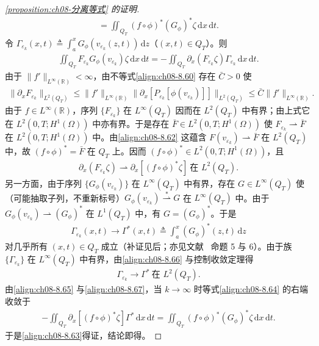 \documentclass[../../main.tex]{subfiles}%
\begin{document}
\begin{proof}[\cref{proposition:ch08-分离等式} 的证明]
\begin{align}
=\iint_{Q_T}(f\circ\phi)^*(G_\phi)^*\zeta\,\mathrm{d}x\,\mathrm{d}t. \label{align:ch08-8.63}
\end{align}
令 $\Gamma_{\varepsilon_k}(x,t)\triangleq\int_a^xG_\phi(v_{\varepsilon_k}(z,t))\,\mathrm{d}z$（$(x,t)\in Q_T$）。则
\begin{align}
\iint_{Q_T}F_{\varepsilon_k}G_\phi(v_{\varepsilon_k})\zeta\,\mathrm{d}x\,\mathrm{d}t
=-\iint_{Q_T}\partial_x(F_{\varepsilon_k}\zeta)\Gamma_{\varepsilon_k}\,\mathrm{d}x\,\mathrm{d}t. \label{align:ch08-8.64}
\end{align}
由于 $\|f'\|_{L^\infty(\mathbb{R})}<\infty$，由不等式\eqref{align:ch08-8.60} 存在 $\bar C>0$ 使
\begin{align*}
\|\partial_xF_{\varepsilon_k}\|_{L^2(Q_T)}
\leqslant\|f'\|_{L^\infty(\mathbb{R})}\|\partial_x[P_{\varepsilon_k}[\phi(v_{\varepsilon_k})]]\|_{L^2(Q_T)}
\leqslant\bar C\|f'\|_{L^\infty(\mathbb{R})}.
\end{align*}
由于 $f\in L^\infty(\mathbb{R})$，序列 $\{F_{\varepsilon_k}\}$ 在 $L^\infty(Q_T)$ 因而在 $L^2(Q_T)$ 中有界；由上式它在 $L^2(0,T;H^1(\Omega))$ 中亦有界。于是存在 $\bar F\in L^2(0,T;H^1(\Omega))$ 使 $F_{\varepsilon_k}\rightharpoonup\bar F$ 在 $L^2(0,T;H^1(\Omega))$ 中。由\eqref{align:ch08-8.62} 这蕴含 $F(v_{\varepsilon_k})\rightharpoonup\bar F$ 在 $L^2(Q_T)$ 中，故 $(f\circ\phi)^*=\bar F$ 在 $Q_T$ 上。因而 $(f\circ\phi)^*\in L^2(0,T;H^1(\Omega))$，且
\begin{align}
\partial_x(F_{\varepsilon_k}\zeta)\rightharpoonup\partial_x[(f\circ\phi)^*\zeta]\ \text{在 }L^2(Q_T). \label{align:ch08-8.65}
\end{align}
另一方面，由于序列 $\{G_\phi(v_{\varepsilon_k})\}$ 在 $L^\infty(Q_T)$ 中有界，存在 $G\in L^\infty(Q_T)$ 使（可能抽取子列，不重新标号）$G_\phi(v_{\varepsilon_k})\stackrel{*}{\rightharpoonup}G$ 在 $L^\infty(Q_T)$ 中。由于 $G_\phi(v_{\varepsilon_k})\rightharpoonup(G_\phi)^*$ 在 $L^1(Q_T)$ 中，有 $G=(G_\phi)^*$。于是
\begin{align}
\Gamma_{\varepsilon_k}(x,t)\to\Gamma^*(x,t)\triangleq \int_a^x(G_\phi)^*(z,t)\,\mathrm{d}z \label{align:ch08-8.66}
\end{align}
对几乎所有 $(x,t)\in Q_T$ 成立（补证见后；亦见文献~\cite{ref100} 命题 5 与 6）。由于族 $\{\Gamma_{\varepsilon_k}\}$ 在 $L^\infty(Q_T)$ 中有界，由\eqref{align:ch08-8.66} 与控制收敛定理得
\begin{align}
\Gamma_{\varepsilon_k}\to\Gamma^*\ \text{在 }L^2(Q_T). \label{align:ch08-8.67}
\end{align}
由\eqref{align:ch08-8.65} 与\eqref{align:ch08-8.67}，当 $k\to\infty$ 时等式\eqref{align:ch08-8.64} 的右端收敛于
\begin{align*}
-\iint_{Q_T}\partial_x[(f\circ\phi)^*\zeta]\Gamma^*\,\mathrm{d}x\,\mathrm{d}t
=\iint_{Q_T}(f\circ\phi)^*(G_\phi)^*\zeta\,\mathrm{d}x\,\mathrm{d}t.
\end{align*}
于是\eqref{align:ch08-8.63}得证，结论即得。
\end{proof}
\end{document}
